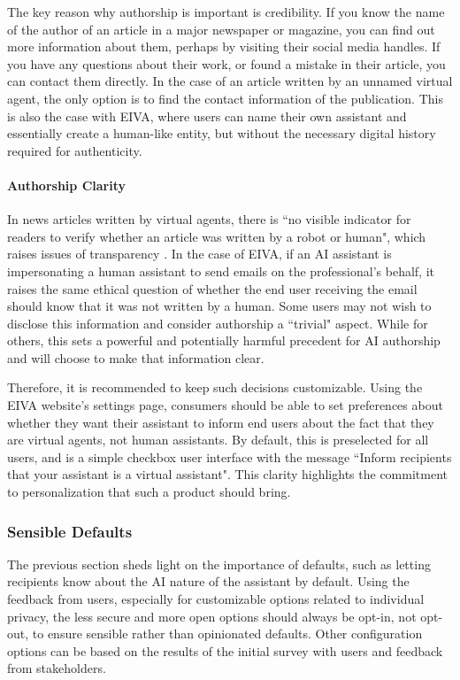 \documentclass{article}
\begin{document}
The key reason why authorship is important is credibility. If you know the name of the author of an article in a major newspaper or magazine, you can find out more information about them, perhaps by visiting their social media handles. If you have any questions about their work, or found a mistake in their article, you can contact them directly. In the case of an article written by an unnamed virtual agent, the only option is to find the contact information of the publication. This is also the case with EIVA, where users can name their own assistant and essentially create a human-like entity, but without the necessary digital history required for authenticity.

\paragraph{Authorship Clarity}

In news articles written by virtual agents, there is ``no visible indicator for readers to verify whether an article was written by a robot or human", which raises issues of transparency \cite{dorr_ethical_2017}. In the case of EIVA, if an AI assistant is impersonating a human assistant to send emails on the professional's behalf, it raises the same ethical question of whether the end user receiving the email should know that it was not written by a human. Some users may not wish to disclose this information and consider authorship a ``trivial" aspect. While for others, this sets a powerful and potentially harmful precedent for AI authorship and will choose to make that information clear.

Therefore, it is recommended to keep such decisions customizable. Using the EIVA website's settings page, consumers should be able to set preferences about whether they want their assistant to inform end users about the fact that they are virtual agents, not human assistants. By default, this is preselected for all users, and is a simple checkbox user interface with the message ``Inform recipients that your assistant is a virtual assistant". This clarity highlights the commitment to personalization that such a product should bring.

\subsubsection{Sensible Defaults}

The previous section sheds light on the importance of defaults, such as letting recipients know about the AI nature of the assistant by default. Using the feedback from users, especially for customizable options related to individual privacy, the less secure and more open options should always be opt-in, not opt-out, to ensure sensible rather than opinionated defaults. Other configuration options can be based on the results of the initial survey with users and feedback from stakeholders.
\end{document}
